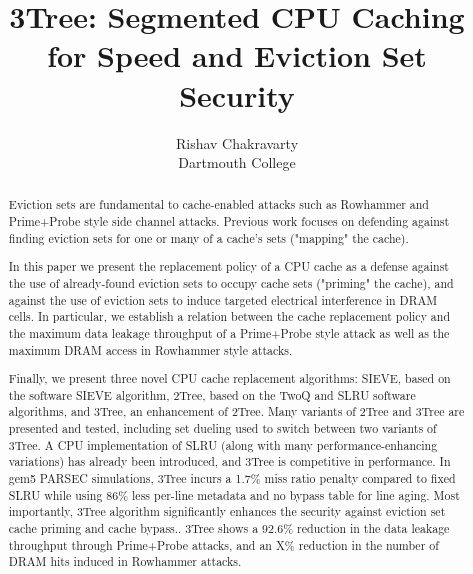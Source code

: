 \documentclass[letterpaper]{article}
\begin{document}

\date{}

\title{3Tree: Segmented CPU Caching for Speed and Eviction Set
  Security}

\author{
{\rm Rishav Chakravarty}\\
Dartmouth College
} %

\maketitle

\begin{abstract}

  Eviction sets are fundamental to cache-enabled attacks such as Rowhammer
  and Prime+Probe style side channel attacks.
  Previous work focuses on defending against finding eviction sets for one or many
  of a cache's sets ("mapping" the cache).

  In this paper we present the replacement policy of a CPU cache as a defense against
  the use of already-found eviction sets to occupy cache sets ("priming" the cache),
	and against the use of eviction sets to induce targeted electrical interference in DRAM cells.
  In particular, we establish a relation between the cache replacement policy and the
  maximum data leakage throughput of a Prime+Probe style attack as well as the
  maximum DRAM access in Rowhammer style attacks.

	Finally, we present three novel CPU cache replacement algorithms:
	SIEVE, based on the software SIEVE algorithm,
	2Tree, based on the TwoQ and SLRU software algorithms,
	and 3Tree, an enhancement of 2Tree.
	Many variants of 2Tree and 3Tree are presented and tested, including
	set dueling used to switch between two variants of 3Tree.
  A CPU implementation of SLRU (along with many performance-enhancing variations) has
  already been introduced, and 3Tree is competitive in performance.
  In gem5 PARSEC simulations, 3Tree incurs a 1.7\% miss ratio penalty
  compared to fixed SLRU while using 86\% less per-line metadata and no bypass table for line aging.
  Most importantly, 3Tree algorithm significantly enhances the security against eviction set
  cache priming and cache bypass..
  3Tree shows a 92.6\% reduction in the data leakage throughput through Prime+Probe attacks,
	and an X\% reduction in the number of DRAM hits induced in Rowhammer attacks.

\end{abstract}
\end{document}
